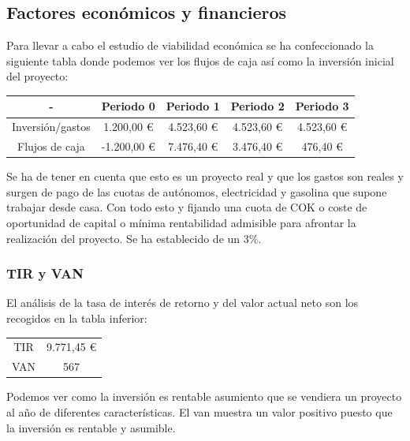 \documentclass[paper=a4, fontsize=11pt,twoside]{scrartcl}	%
\begin{document}
    \subsection{Factores económicos y financieros}
        Para llevar a cabo el estudio de viabilidad económica se ha confeccionado la siguiente tabla donde
        podemos ver los flujos de caja así como la inversión inicial del proyecto:
        \begin{center}
            \begin{tabular}{||c | c |c |c |c ||} 
            \hline
             - & Periodo 0 & Periodo 1& Periodo 2 & Periodo 3  \\ [0.5ex] 
            \hline
            \hline
                Inversión/gastos &1.200,00 € 	& 4.523,60 € 	& 4.523,60 € 	& 4.523,60 € \\ 
                Flujos de caja  &-1.200,00 € 	& 7.476,40 € 	& 3.476,40 € 	& 476,40 € \\ 
            \hline
            \end{tabular}
        \end{center}
        Se ha de tener en cuenta que esto es un proyecto real y que los gastos son reales y surgen de pago de
        las cuotas de autónomos, electricidad y gasolina que supone trabajar desde casa. Con todo esto y fijando una cuota
        de COK o coste de oportunidad de capital o mínima rentabilidad admisible para afrontar la realización del
        proyecto. Se ha establecido de un 3\%.
    \subsubsection{TIR y VAN}
        El análisis de la tasa de interés de retorno y del valor actual neto son los recogidos en la tabla inferior:
        \begin{center}
            \begin{tabular}{||c | c ||} 
            \hline
                TIR & 9.771,45 € \\ [0.5ex] 
                VAN & 567  \\ [0.5ex] 
            \hline
            \end{tabular}
        \end{center}
        Podemos ver como la inversión es rentable asumiento que se vendiera un proyecto al año de diferentes características.
        El van muestra un valor positivo puesto que la inversión es rentable y asumible.
\end{document}
